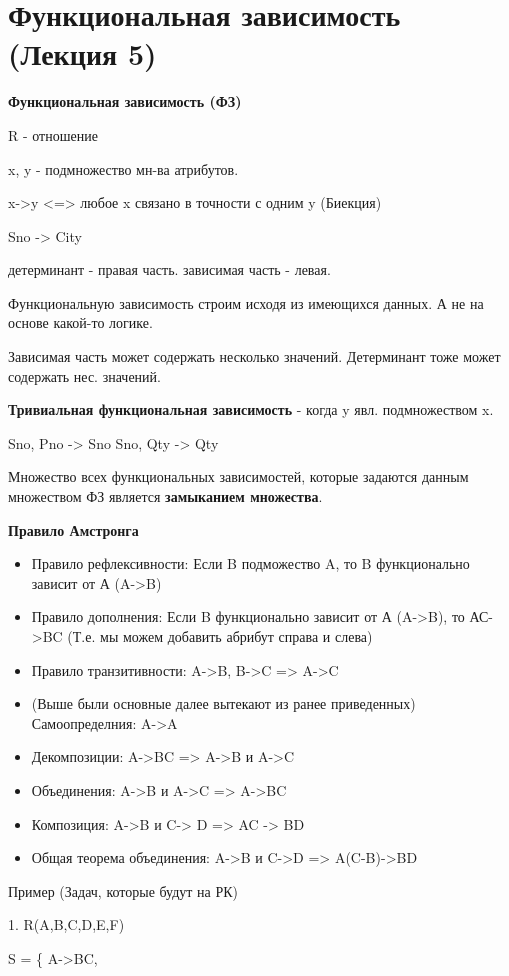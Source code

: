 \chapter{Функциональная зависимость (Лекция 5)}

\textbf{Функциональная зависимость (ФЗ)}

R - отношение

x, y - подмножество мн-ва атрибутов.

x->y <=> любое x связано в точности с одним y (Биекция)

{Sno} -> {City}

детерминант - правая часть.
зависимая часть - левая.

Функциональную зависимость строим исходя из имеющихся данных.
А не на основе какой-то логике.

Зависимая часть может содержать несколько значений.
Детерминант тоже может содержать нес. значений.

\textbf{Тривиальная функциональная зависимость} - когда y явл. подмножеством x.

{Sno, Pno} -> {Sno}
{Sno, Qty} -> {Qty}

Множество всех функциональных зависимостей, которые задаются данным множеством
ФЗ является \textbf{замыканием множества}.

\textbf{Правило Амстронга}

\begin{itemize}
	\item Правило рефлексивности: Если B подможество A, то B функционально зависит от А (A->B)
	\item Правило дополнения: Если B функционально зависит от А (A->B), то АС->BC
	      (Т.е. мы можем добавить абрибут справа и слева)
	\item Правило транзитивности: A->B, B->C => A->C
	\item (Выше были основные далее вытекают из ранее приведенных)
	      Самоопределния: A->A
	\item Декомпозиции: A->BC => A->B и A->C
	\item Объединения: A->B и  A->C => A->BC
	\item Композиция: A->B и C-> D => AC -> BD
	\item Общая теорема объединения: A->B и C->D => A(C-B)->BD
\end{itemize}

Пример (Задач, которые будут на РК)

1. R(A,B,C,D,E,F)

S = \{
A->BC,

